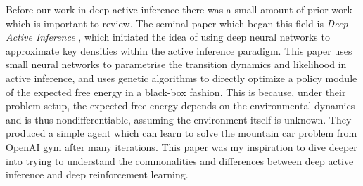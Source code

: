 
Before our work in deep active inference there was a small amount of prior work which is important to review. The seminal paper which began this field is \emph{Deep Active Inference} \citep{ueltzhoffer_deep_2018}, which initiated the idea of using deep neural networks to approximate key densities within the active inference paradigm. This paper uses small neural networks to parametrise the transition dynamics and likelihood in active inference, and uses genetic algorithms to directly optimize a policy module of the expected free energy in a black-box fashion. This is because, under their problem setup, the expected free energy depends on the environmental dynamics and is thus nondifferentiable, assuming the environment itself is unknown. They produced a simple agent which can learn to solve the mountain car problem from OpenAI gym after many iterations. This paper was my inspiration to dive deeper into trying to understand the commonalities and differences between deep active inference and deep reinforcement learning.

